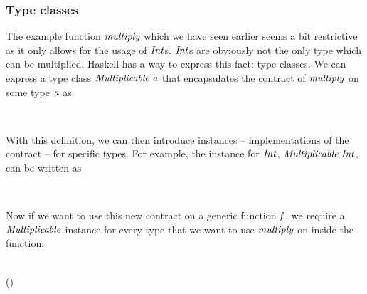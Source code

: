 \documentclass[paper=A4,twoside=true,openright,parskip=full,chapterprefix=true,headings=normal,bibliography=totoc,listof=totoc,titlepage=on,captions=tableabove,draft=false,british]{scrreprt}%
\begin{document}
\hypertarget{type-classes}{%
\subsubsection{Type classes}\label{type-classes}}

The example function \ensuremath{\Varid{multiply}} which we have seen earlier seems a bit
restrictive as it only allows for the usage of \ensuremath{\Conid{Int}}s. \ensuremath{\Conid{Int}}s are
obviously not the only type which can be multiplied. Haskell has a way
to express this fact: type classes. We can express a type class
\ensuremath{\Conid{Multiplicable}\;\Varid{a}} that encapsulates the contract of \ensuremath{\Varid{multiply}} on some
type \ensuremath{\Varid{a}} as


\begin{hscode}\SaveRestoreHook
{}%
%
%
\>[B]{}\;\;\;\<[E]%
\\
\>[B]{}\<[5]%
\>[5]{}\mathbin{::}\to {}\to {}\<[E]%
\ColumnHook
\end{hscode}\resethooks
\vspace{-2\baselineskip}

With this definition, we can then introduce instances -- implementations
of the contract -- for specific types. For example, the instance for
\ensuremath{\Conid{Int}}, \ensuremath{\Conid{Multiplicable}\;\Conid{Int}}, can be written as


\begin{hscode}\SaveRestoreHook
{}%
%
%
\>[B]{}\;\;\;\<[E]%
\\
\>[B]{}\<[5]%
\>[5]{}\;\;\mathrel{=}\mathbin{*}\<[E]%
\ColumnHook
\end{hscode}\resethooks
\vspace{-2\baselineskip}

Now if we want to use this new contract on a generic function \ensuremath{\Varid{f}}, we
require a \ensuremath{\Conid{Multiplicable}} instance for every type that we want to use
\ensuremath{\Varid{multiply}} on inside the function:


\begin{hscode}\SaveRestoreHook
{}%
%
\>[B]{}\mathbin{::}\;\Rightarrow {}\to {}\to {}\<[E]%
\\
\>[B]{}\;\;\mathrel{=}\;(\;\;)\;\<[E]%
\ColumnHook
\end{hscode}\resethooks
\vspace{-2\baselineskip}
\end{document}
